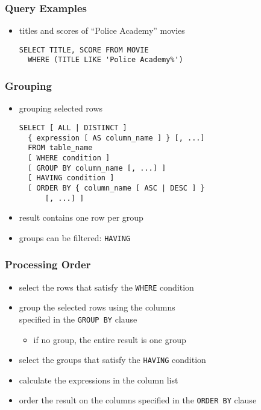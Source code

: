 \documentclass[dvipsnames]{beamer}
\theoremstyle{plain}
\begin{document}
\begin{frame}[fragile]
  \frametitle{Query Examples}

  \begin{itemize}
    \item titles and scores of ``Police Academy'' movies
    \begin{lstlisting}
SELECT TITLE, SCORE FROM MOVIE
  WHERE (TITLE LIKE 'Police Academy%')
    \end{lstlisting}
  \end{itemize}
\end{frame}

\begin{frame}[fragile]
  \frametitle{Grouping}

  \begin{itemize}
    \item grouping selected rows
    \begin{lstlisting}
SELECT [ ALL | DISTINCT ]
  { expression [ AS column_name ] } [, ...]
  FROM table_name
  [ WHERE condition ]
  [ GROUP BY column_name [, ...] ]
  [ HAVING condition ]
  [ ORDER BY { column_name [ ASC | DESC ] }
      [, ...] ]
    \end{lstlisting}

    \medskip
    \item result contains one row per group
    \item groups can be filtered: \lstinline!HAVING!
  \end{itemize}
\end{frame}

\begin{frame}
  \frametitle{Processing Order}

  \begin{itemize}
    \item select the rows that satisfy the \lstinline!WHERE! condition

    \pause
    \item group the selected rows using the columns\\
      specified in the \lstinline!GROUP BY! clause
    \begin{itemize}
      \item if no group, the entire result is one group
    \end{itemize}

    \pause
    \item select the groups that satisfy the \lstinline!HAVING! condition

    \pause
    \item calculate the expressions in the column list

    \pause
    \item order the result on the columns
      specified in the \lstinline!ORDER BY! clause
  \end{itemize}
\end{frame}
\end{document}

